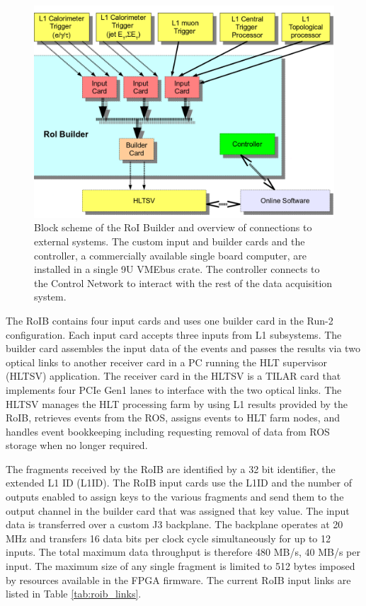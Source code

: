 \documentclass{JINST}
\begin{document}
\begin{figure}[tbp] %
\centering
\includegraphics[width=.65\textwidth]{figures/RoIB_context_v2.png}
\caption{Block scheme of the RoI Builder and overview of connections to external systems.  The
custom input and builder cards and the controller, a commercially available single board computer,
are installed in a single 9U VMEbus crate. The controller connects to the Control Network to interact with the rest of the 
data acquisition system.}
\label{roib_run1}
\end{figure}

The RoIB contains four input cards and uses one builder card in the Run-2 configuration. Each input card accepts three inputs from 
L1 subsystems. 
The builder card assembles the input data of the events and passes the results via two optical links 
to another receiver card in a PC running the HLT supervisor (HLTSV) application. The receiver card in the HLTSV is a TILAR card \cite{tilar}
 that implements four PCIe Gen1 lanes to interface with the two optical links. The HLTSV manages the HLT processing farm by using L1 results provided by the RoIB, retrieves events from the ROS, assigns events to HLT farm nodes, and handles event bookkeeping including requesting removal of data from ROS storage when no longer required. 

The fragments received by the RoIB are identified by a 32 bit identifier, the extended L1 ID (L1ID). 
The RoIB input cards use the L1ID and the number of outputs enabled to assign keys to the various fragments and send them to the output channel in the builder card that was 
assigned that key value. The input data is transferred over a custom J3 backplane. The backplane operates at 20 MHz and transfers 16 data bits per 
clock cycle simultaneously for up to 12 inputs. The total maximum data throughput is therefore 480 MB/s, 40 MB/s per input.  
The maximum size of any single fragment is limited to 512 bytes imposed by resources available in the FPGA firmware. The current RoIB input 
links are listed in Table \ref{tab:roib_links}.
\end{document}
